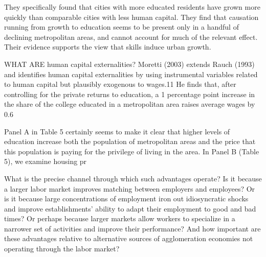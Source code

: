 They specifically found that cities with more educated residents have grown more quickly than comparable cities with less human capital. They find that causation running from growth to education seems to be present only in a handful of declining metropolitan areas, and cannot account for much of the relevant effect. Their evidence supports the view that skills induce urban growth.



WHAT ARE human capital externalities?
Moretti (2003) extends Rauch (1993) and identifies human capital externalities by using instrumental variables related to human capital but plausibly exogenous to wages.11 He finds that, after controlling for the private returns to education, a 1 percentage point increase in the share of the college educated in a metropolitan area raises average wages by 0.6%


Panel A in Table 5 certainly seems to make it clear that higher levels of education increase both the population of metropolitan areas and the price that this population is paying for the privilege of living in the area. In Panel B (Table 5), we examine housing pr

What is the precise channel through which such advantages operate? Is it because a larger labor market improves matching between employers and employees? Or is it because large concentrations of employment iron out idiosyncratic shocks and improve establishments' ability to adapt their employment to good and bad times? Or perhaps because larger markets allow workers to specialize in a narrower set of activities and improve their performance? And how important are these advantages relative to alternative sources of agglomeration economies not operating through the labor market? %

